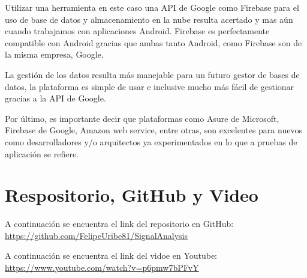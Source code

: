 \documentclass[conference,compsoc,onecolumn]{IEEEtran}
\begin{document}
Utilizar una herramienta en este caso una API de Google como Firebase para el uso de base de datos y almacenamiento en la nube resulta acertado y mas aún cuando trabajamos con aplicaciones Android. Firebase es perfectamente compatible con Android gracias que ambas tanto Android, como Firebase son de la misma empresa, Google.\newline

La gestión de los datos resulta más manejable para un futuro gestor de bases de datos, la plataforma es simple de usar e inclusive mucho más fácil de gestionar gracias a la API de Google.\newline

Por último, es importante decir que plataformas como Asure de Microsoft, Firebase de Google, Amazon web service, entre otras, son excelentes para nuevos como desarrolladores y/o arquitectos ya experimentados en lo que a pruebas de aplicación se refiere.\newline

\section{Respositorio, GitHub y Video}
\href{https://github.com/FelipeUribe81/SignalAnalysis}{} A continuación se encuentra el link del repositorio en GitHub: \url{https://github.com/FelipeUribe81/SignalAnalysis}\newline

\href{https://www.youtube.com/watch?v=p6pmw7bPFvY}{} A continuación se encuentra el link del vidoe en Youtube: \url{https://www.youtube.com/watch?v=p6pmw7bPFvY}\newline
\end{document}
